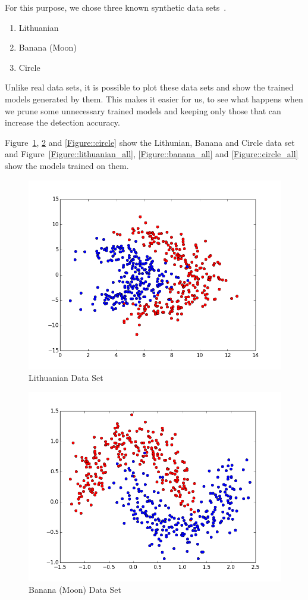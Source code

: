 For this purpose, we chose three known synthetic data sets~\cite{Duin2000}. 
\begin{enumerate}
  \item Lithuanian
  \item Banana (Moon)
  \item Circle
\end{enumerate}  
Unlike real data sets, it is possible to plot these data sets and show the trained models generated by them. This makes it easier for us, to see what happens when we prune some unnecessary trained models and keeping only those that can increase the detection accuracy.

Figure~\ref{Figure::lithuanian}, \ref{Figure::banana} and \ref{Figure::circle} show the Lithunian, Banana and Circle data set and Figure~\ref{Figure::lithuanian_all}, \ref{Figure::banana_all} and \ref{Figure::circle_all} show the models trained on them.

\begin{figure}[]
\centering
\includegraphics[scale=0.6]{figs/dataset_Lithuanian}
\caption{Lithuanian Data Set}
\label{Figure::lithuanian}
\end{figure}

\begin{figure}[]
\centering
\includegraphics[scale=0.6]{figs/dataset_Banana}
\caption{Banana (Moon) Data Set}
\label{Figure::banana}
\end{figure}

